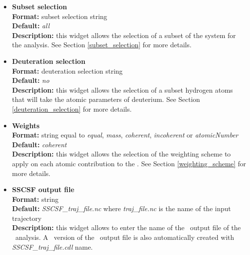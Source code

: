 \documentclass[a4paper,11pt]{report}
\newcommand{\qshells}{\textit{q}-shells}
\begin{document}
\begin{itemize}
For example,
\begin{itemize}
\item \textit{0:10:1} will generate \qshells\ of radii 0, 1, 2, 3, 4, 5, 6, 7, 8, 9, 10.
\item \textit{3:12:2} will generate \qshells\ of radii 3, 5, 7, 9, 11.
\end{itemize}

\hypertarget{sscsf_subset_selection}{}
\item \textbf{Subset selection}\\
\textbf{Format:} subset selection string\\
\textbf{Default:} \textit{all}\\
\textbf{Description:} this widget allows the selection of a subset of the system for the analysis. 
See Section \ref{subset_selection} for more details.

\hypertarget{sscsf_deuteration_selection}{}
\item \textbf{Deuteration selection}\\
\textbf{Format:} deuteration selection string\\
\textbf{Default:} \textit{no}\\
\textbf{Description:} this widget allows the selection of a subset hydrogen atoms that will take the atomic parameters 
of deuterium. See Section \ref{deuteration_selection} for more details.

\hypertarget{sscsf_weights}{}
\item \textbf{Weights}\\
\textbf{Format:} string equal to \textit{equal}, \textit{mass}, \textit{coherent}, \textit{incoherent} or \textit{atomicNumber}\\
\textbf{Default:} \textit{coherent}\\
\textbf{Description:} this widget allows the selection of the weighting scheme to apply on each atomic contribution 
to the \SSCSF . See Section \ref{weighting_scheme} for more details. 

\hypertarget{sscsf_disfg_output_file}{}
\item \textbf{SSCSF output file}\\
\textbf{Format:} string\\
\textbf{Default:} \textit{SSCSF\_traj\_file.nc} where \textit{traj\_file.nc} is the name of the input trajectory\\
\textbf{Description:} this widget allows to enter the name of the \NetCDF\ output file of the \SSCSF\ analysis. A \CDL\ 
version of the \NetCDF\ output file is also automatically created with \textit{SSCSF\_traj\_file.cdl} name.
\end{itemize}
\end{document}
